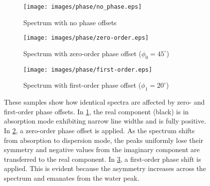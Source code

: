 \begin{figure}
    \centering
    \begin{subfigure}{0.32\textwidth}
        \centering
        \texttt{[image: images/phase/no\_phase.eps]}
        \caption{Spectrum with no phase offsets}
        \label{subfig:no phase}        
    \end{subfigure}
    \begin{subfigure}{0.32\textwidth}
        \centering
        \texttt{[image: images/phase/zero-order.eps]}
        \caption{Spectrum with zero-order phase offset ($\phi_0 = 45^{\circ}$)}
        \label{subfig:zero order phase}        
    \end{subfigure}
    \begin{subfigure}{0.32\textwidth}
        \centering
        \texttt{[image: images/phase/first-order.eps]}
        \caption{Spectrum with first-order phase offset ($\phi_1 = 20^{\circ}$)}
        \label{subfig:first order phase}        
    \end{subfigure}
    \caption{These samples show how identical spectra are affected by zero- and first-order phase offsets. In \ref{subfig:no phase}, the real component (black) is in absorption mode exhibiting narrow line widths and is fully positive. In \ref{subfig:zero order phase}, a zero-order phase offset is applied. As the spectrum shifts from absorption to dispersion mode, the peaks uniformly lose their symmetry and negative values from the imaginary component are transferred to the real component. In \ref{subfig:first order phase}, a first-order phase shift is applied. This is evident because the asymmetry increases across the spectrum and emanates from the water peak.}
    \label{fig:phase effects}
\end{figure}